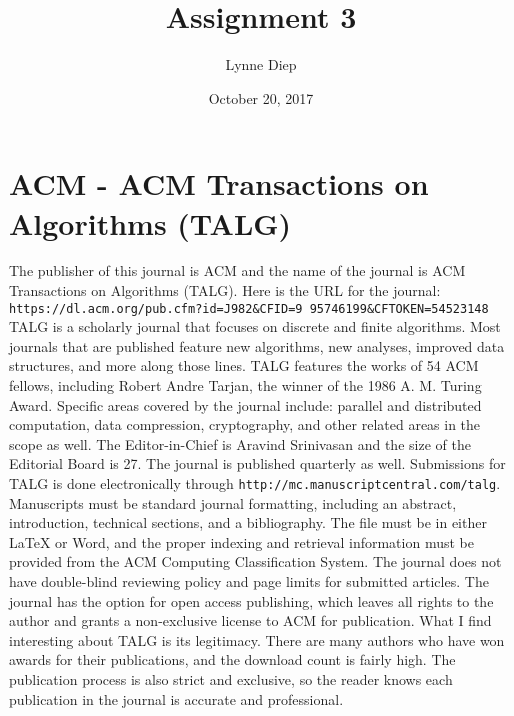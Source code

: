 \documentclass[twocolumn]{article}
\title{Assignment 3}
\author{Lynne Diep }
\date{October 20, 2017}
\begin{document}
\maketitle

\section{ACM - ACM Transactions on Algorithms (TALG)}
The publisher of this journal is ACM and the name of the journal is ACM Transactions on Algorithms (TALG). Here is the URL for the journal: 
\\\texttt{https://dl.acm.org/pub.cfm?id=J982&CFID=9
95746199&CFTOKEN=54523148}
\\
TALG is a scholarly journal that focuses on discrete and finite algorithms. Most journals that are published feature new algorithms, new analyses, improved data structures, and more along those lines. TALG features the works of 54 ACM fellows, including Robert Andre Tarjan, the winner of the 1986 A. M. Turing Award. Specific areas covered by the journal include: parallel and distributed computation, data compression, cryptography, and other related areas in the scope as well.
The Editor-in-Chief is Aravind Srinivasan and the size of the Editorial Board is 27.
The journal is published quarterly as well.
Submissions for TALG is done electronically through 
\texttt{http://mc.manuscriptcentral.com/talg}. Manuscripts must be standard journal formatting, including an abstract, introduction, technical sections, and a bibliography. The file must be in either {\LaTeX} or Word, and the proper indexing and retrieval information must be provided from the ACM Computing Classification System.
The journal does not have double-blind reviewing policy and page limits for submitted articles.
The journal has the option for open access publishing, which leaves all rights to the author and grants a non-exclusive license to ACM for publication.
What I find interesting about TALG is its legitimacy. There are many authors who have won awards for their publications, and the download count is fairly high. The publication process is also strict and exclusive, so the reader knows each publication in the journal is accurate and professional.
\end{document}

